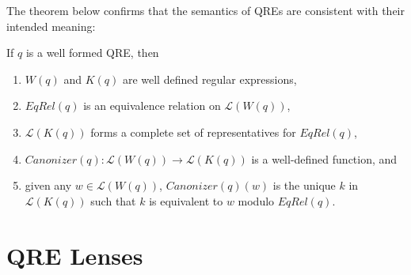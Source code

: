\documentclass{svproc}
\begin{document}
The theorem below confirms that the semantics of QREs are consistent with their
intended meaning:
\begin{theorem}
If $q$ is a well formed QRE, then
\begin{enumerate}
  \item $W(q)$ and $K(q)$ are well defined regular expressions,
  \item  $EqRel(q)$ is an equivalence relation on $\mathcal{L}(W(q))$,
  \item  $\mathcal{L}(K(q))$ forms a complete set of representatives for
  $EqRel(q)$,
  \item $Canonizer(q):\mathcal{L}(W(q)) \longrightarrow \mathcal{L}(K(q))$ is a
  well-defined function, and
  \item  given any $w \in \mathcal{L}(W(q))$, $Canonizer(q)(w)$ is the unique
  $k$ in $\mathcal{L}(K(q))$ such that $k$ is equivalent to $w$ modulo
  $EqRel(q)$.
  \end{enumerate}
\end{theorem}

\section{QRE Lenses}
\label{QRE-lenses} 
\end{document}
